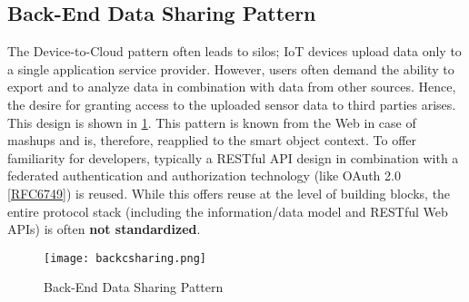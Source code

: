 \documentclass[10pt,journal,compsoc]{IEEEtran}
\begin{document}
	\subsection{Back-End Data Sharing Pattern}\label{backenddatasharing}
	\cite{rfc7452}The Device-to-Cloud pattern often leads to silos; IoT devices upload
	data only to a single application service provider.  However, users
	often demand the ability to export and to analyze data in combination
	with data from other sources.  Hence, the desire for granting access
	to the uploaded sensor data to third parties arises.  This design is
	shown in \cref{back-share}.  This pattern is known from the Web in case of
	mashups and is, therefore, reapplied to the smart object context.  To
	offer familiarity for developers, typically a RESTful API design in
	combination with a federated authentication and authorization
	technology (like OAuth 2.0 [\href{https://datatracker.ietf.org/doc/html/rfc6749}{RFC6749}]) is reused.  While this offers
	reuse at the level of building blocks, the entire protocol stack
	(including the information/data model and RESTful Web APIs) is often
	\textbf{not standardized}\cite{rfc7452}.
	\begin{figure}[h]
		\texttt{[image: backcsharing.png]}
		\caption{Back-End Data Sharing Pattern\cite{rfc7452}}
		\label{back-share}
	\end{figure}


\end{document}
